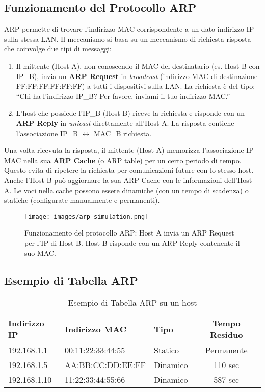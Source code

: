 \subsection{Funzionamento del Protocollo ARP}
ARP permette di trovare l'indirizzo MAC corrispondente a un dato indirizzo IP sulla stessa LAN. Il meccanismo si basa su un meccanismo di richiesta-risposta che coinvolge due tipi di messaggi:
\begin{enumerate}
    \item Il mittente (Host A), non conoscendo il MAC del destinatario (es. Host B con IP\_B), invia un \textbf{ARP Request} in \textit{broadcast} (indirizzo MAC di destinazione FF:FF:FF:FF:FF:FF) a tutti i dispositivi sulla LAN. La richiesta è del tipo: ``Chi ha l'indirizzo IP\_B? Per favore, inviami il tuo indirizzo MAC.''
    \item L'host che possiede l'IP\_B (Host B) riceve la richiesta e risponde con un \textbf{ARP Reply} in \textit{unicast} direttamente all'Host A. La risposta contiene l'associazione IP\_B $\leftrightarrow$ MAC\_B richiesta.
\end{enumerate}
Una volta ricevuta la risposta, il mittente (Host A) memorizza l'associazione IP-MAC nella sua \textbf{ARP Cache} (o ARP table) per un certo periodo di tempo. Questo evita di ripetere la richiesta per comunicazioni future con lo stesso host. Anche l'Host B può aggiornare la sua ARP Cache con le informazioni dell'Host A. Le voci nella cache possono essere dinamiche (con un tempo di scadenza) o statiche (configurate manualmente e permanenti).

\begin{figure}[H]
    \centering
    \texttt{[image: images/arp\_simulation.png]}
    \caption{Funzionamento del protocollo ARP: Host A invia un ARP Request per l'IP di Host B. Host B risponde con un ARP Reply contenente il suo MAC.}
    \label{fig:arp_simulation_combined}
\end{figure}

\subsection{Esempio di Tabella ARP}
\begin{table}[H]
    \centering
    \label{tab:arp_cache_example_combined}
    \begin{tabular}{|l|l|l|c|}
        \hline
        \rowcolor{bg_custom}
        \textbf{Indirizzo IP} & \textbf{Indirizzo MAC} & \textbf{Tipo} & \textbf{Tempo Residuo} \\
        \hline
        192.168.1.1 & 00:11:22:33:44:55 & Statico & Permanente \\
        \hline
        192.168.1.5 & AA:BB:CC:DD:EE:FF & Dinamico & 110 sec \\
        \hline
        192.168.1.10 & 11:22:33:44:55:66 & Dinamico & 587 sec \\
        \hline
    \end{tabular}
    \caption{Esempio di Tabella ARP su un host}
\end{table}

